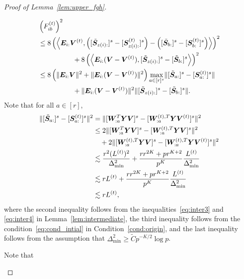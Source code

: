 \documentclass[journal]{IEEEtran}
\theoremstyle{definition}
\theoremstyle{definition}
\newcommand{\of}[1]{\left(#1\right)}
\newcommand{\ang}[1]{\left\langle#1\right\rangle}
\begin{document}
\begin{proof}[Proof of Lemma~\ref{lem:upper_fgh}]
\begin{enumerate}[wide]
    \vspace{-0.5cm}
    \small
    \begin{align}
        &\of{F_{ib}^{(t)}}^2 \\
        & \leq 8 \of{\ang{\mE_{i:} \mV^{(t)}, \of{ [  \tilde \mS_{z(i):} ]^s  -  [  \mS_{z(i):}^{(t)} ]^s  }  - \of{  [  \tilde \mS_{b:} ]^s  -  [  \mS_{b:}^{(t)} ]^s  }  }  }^2 \\
         & \quad \quad \quad \quad \quad + 8\of{ \ang{ \mE_{i:} (\mV - \mV^{(t)} ), [  \tilde \mS_{z(i):} ]^s - [ \tilde  \mS_{b:} ]^s  }}^2 \\
         & \leq 8 \of{ \onormSize{}{\mE_{i:} \mV}^2 + \onormSize{}{\mE_{i:} ( \mV - \mV^{(t)} )}^2 } \max_{a \in [r]^s} \onormSize{}{  [  \tilde \mS_{a:} ]^s - [   \mS_{a:}^{(t)} ]^s  } \\
          & \quad \quad \quad \quad \quad +\onormSize{}{\mE_{i:} ( \mV - \mV^{(t)} )}^2  \onormSize{}{  [  \tilde \mS_{z(i):} ]^s - [  \tilde \mS_{b:} ]^s  }. \label{eq:fib_decomp}
    \end{align}
    \normalsize
    Note that for all $a \in [r]$,
    \begin{align}
        \onormSize{}{  [  \tilde \mS_{a:} ]^s - [   \mS_{a:}^{(t)} ]^s  }^2 &= \onormSize{}{ [ \mW_{:a}^T \mY \mV ]^s - [ \mW_{:a}^{(t),T} \mY \mV^{(t)} ]^s }^2 \\
        &\leq 2 \onormSize{}{ [ \mW_{:a}^T \mY \mV ]^s  - [ \mW_{:a}^{(t),T} \mY \mV ]^s  }^2 \\
        & \quad + 2 \onormSize{}{[ \mW_{:a}^{(t),T} \mY \mV ]^s - [ \mW_{:a}^{(t),T} \mY \mV^{(t)} ]^s }^2\\
        & \lesssim \frac{ r^2 (L^{(t)})^2}{ \Delta_{\min}^2} + \frac{ r r^{2K} + p r^{K+2}}{p^K} \frac{L^{(t)}}{\Delta_{\min}^2}\\
        & \lesssim  r L^{(t)}+  \frac{ r r^{2K} + p r^{K+2}}{p^K} \frac{L^{(t)}}{\Delta_{\min}^2}\\
        & \lesssim  r L^{(t)},\label{eq:fib_1}
    \end{align}
    where the second inequality follows from the inequalities~\eqref{eq:inter3} and \eqref{eq:inter4} in Lemma~\ref{lem:intermediate}, the third inequality follows from the condition~\eqref{eq:cond_intial} in Condition~\ref{cond:origin}, and the last inequality follows from the assumption that $\Delta_{\min}^2 \geq \tilde C p^{-K/2}\log p$. 
    
    Note that 
    

\end{enumerate}
\end{proof}
\end{document}
